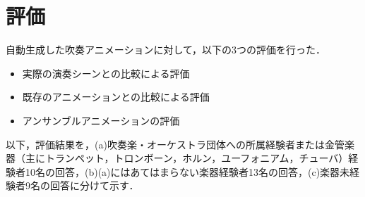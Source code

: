 \section{評価} \label{sec:review}
自動生成した吹奏アニメーションに対して，以下の3つの評価を行った．
\begin{itemize}
	\item 実際の演奏シーンとの比較による評価
	\item 既存のアニメーションとの比較による評価
	\item アンサンブルアニメーションの評価
\end{itemize}
以下，評価結果を，(a)吹奏楽・オーケストラ団体への所属経験者または金管楽器（主にトランペット，トロンボーン，ホルン，ユーフォニアム，チューバ）経験者10名の回答，(b)(a)にはあてはまらない楽器経験者13名の回答，(c)楽器未経験者9名の回答に分けて示す．

\newpage
